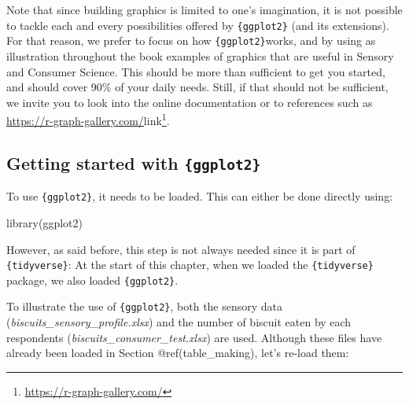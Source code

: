 \documentclass[
]{krantz}
\makeatletter
\newenvironment{Shaded}{\begin{snugshade}}{\end{snugshade}}
\newcommand{\FunctionTok}[1]{\textcolor[rgb]{0,0,0}{#1}}
\newcommand{\NormalTok}[1]{#1}
\renewcommand{\href}[2]{#2\footnote{\url{#1}}}
\newenvironment{kframe}{%
\medskip{}
\setlength{\fboxsep}{.8em}
 \def\at@end@of@kframe{}%
 \ifinner\ifhmode%
  \def\at@end@of@kframe{\end{minipage}}%
  \begin{minipage}{\columnwidth}%
 \fi\fi%
 \def\FrameCommand##1{\hskip\@totalleftmargin \hskip-\fboxsep
 \colorbox{shadecolor}{##1}\hskip-\fboxsep
     \hskip-\linewidth \hskip-\@totalleftmargin \hskip\columnwidth}%
 \MakeFramed {\advance\hsize-\width
   \@totalleftmargin\z@ \linewidth\hsize
   \@setminipage}}%
 {\par\unskip\endMakeFramed%
 \at@end@of@kframe}
\renewenvironment{Shaded}{\begin{kframe}}{\end{kframe}}
\makeatother
\begin{document}
Note that since building graphics is limited to one's imagination, it is not possible to tackle each and every possibilities offered by \texttt{\{ggplot2\}} (and its extensions). For that reason, we prefer to focus on how \texttt{\{ggplot2\}}works, and by using as illustration throughout the book examples of graphics that are useful in Sensory and Consumer Science. This should be more than sufficient to get you started, and should cover 90\% of your daily needs. Still, if that should not be sufficient, we invite you to look into the online documentation or to references such as \url{https://r-graph-gallery.com/}\href{https://r-graph-gallery.com/}{link}.

\hypertarget{getting-started-with-ggplot2}{%
\subsection{\texorpdfstring{Getting started with \texttt{\{ggplot2\}}}{Getting started with \{ggplot2\}}}\label{getting-started-with-ggplot2}}

To use \texttt{\{ggplot2\}}, it needs to be loaded. This can either be done directly using:

\begin{Shaded}
\begin{Highlighting}[]
\FunctionTok{library}\NormalTok{(ggplot2)}
\end{Highlighting}
\end{Shaded}

However, as said before, this step is not always needed since it is part of \texttt{\{tidyverse\}}: At the start of this chapter, when we loaded the \texttt{\{tidyverse\}} package, we also loaded \texttt{\{ggplot2\}}.

To illustrate the use of \texttt{\{ggplot2\}}, both the sensory data (\emph{biscuits\_sensory\_profile.xlsx}) and the number of biscuit eaten by each respondents (\emph{biscuits\_consumer\_test.xlsx}) are used. Although these files have already been loaded in Section @ref(table\_making), let's re-load them:
\end{document}
